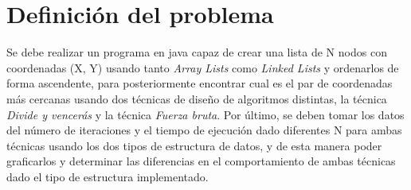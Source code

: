 \section{Definición del problema}

Se debe realizar un programa en java capaz de crear una lista de N nodos con coordenadas (X, Y) usando tanto \textit{Array Lists} como \textit{Linked Lists} y ordenarlos de forma ascendente, para posteriormente encontrar cual es el par de coordenadas más cercanas usando dos técnicas de diseño de algoritmos distintas, la técnica \textit{Divide y vencerás} y la técnica \textit{Fuerza bruta}. Por último, se deben tomar los datos del número de iteraciones y el tiempo de ejecución dado diferentes N para ambas técnicas usando los dos tipos de estructura de datos, y de esta manera poder graficarlos y determinar las diferencias en el comportamiento de ambas técnicas dado el tipo de estructura implementado.